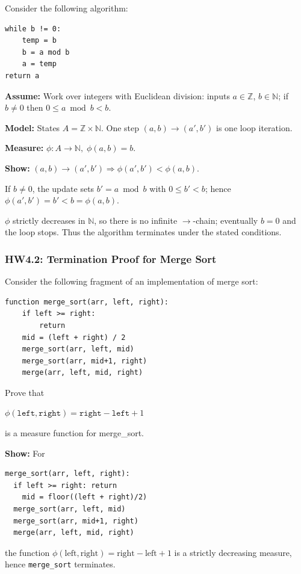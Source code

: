 \documentclass{article}
\theoremstyle{theorem}
\theoremstyle{definition}
\theoremstyle{remark}
\begin{document}
Consider the following algorithm:

\begin{verbatim}
while b != 0:
    temp = b
    b = a mod b
    a = temp
return a
\end{verbatim}

\textbf{Assume:} Work over integers with Euclidean division: inputs $a\in\mathbb Z$, $b\in\mathbb N$; if $b\neq 0$ then $0\le a\bmod b<b$.

\textbf{Model:} States $A=\mathbb Z\times\mathbb N$. One step $(a,b)\to(a',b')$ is one loop iteration.

\textbf{Measure:} $\phi:A\to\mathbb N,\;\phi(a,b)=b$.

\textbf{Show:} $(a,b)\to(a',b') \Rightarrow \phi(a',b')<\phi(a,b)$.

If $b\neq 0$, the update sets $b'=a\bmod b$ with $0\le b'<b$; hence $\phi(a',b')=b'<b=\phi(a,b)$.

$\phi$ strictly decreases in $\mathbb N$, so there is no infinite $\to$-chain; eventually $b=0$ and the loop stops. Thus the algorithm terminates under the stated conditions.

\subsubsection{HW4.2: Termination Proof for Merge Sort}

Consider the following fragment of an implementation of merge sort:

\begin{verbatim}
function merge_sort(arr, left, right):
    if left >= right:
        return
    mid = (left + right) / 2
    merge_sort(arr, left, mid)
    merge_sort(arr, mid+1, right)
    merge(arr, left, mid, right)
\end{verbatim}

Prove that 

$\phi(\texttt{left}, \texttt{right}) = \texttt{right} - \texttt{left} + 1$ 

is a measure function for merge\_sort.

\textbf{Show:} For

\begin{verbatim}
merge_sort(arr, left, right):
  if left >= right: return
    mid = floor((left + right)/2)
  merge_sort(arr, left, mid)
  merge_sort(arr, mid+1, right)
  merge(arr, left, mid, right)
\end{verbatim}


the function $\phi(\text{left},\text{right})=\text{right}-\text{left}+1$ is a strictly decreasing measure, hence \texttt{merge\_sort} terminates.
\end{document}

